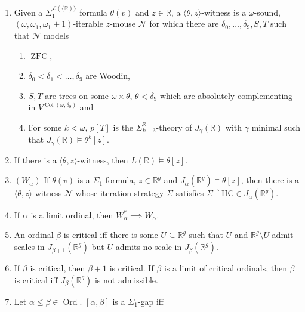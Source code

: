 \documentclass[12pt,a4paper]{article}
\theoremstyle{nicestyle}
\DeclareMathOperator{\Col}{Col}
\DeclareMathOperator{\ord}{Ord}
\DeclareMathOperator{\ZFC}{ZFC}
\begin{document}
\begin{enumerate}
\item Given a $\Sigma_1^{\mathcal{L}(\{\mathbb{R})\}}$ formula $\theta(v)$
  and $z \in \mathbb{R}$, a $\langle \theta, z \rangle$-witness is a
  $\omega$-sound, $(\omega, \omega_{1}, \omega_1+1)$-iterable
  $z$-mouse $\mathcal{N}$ for which there are
  $\delta_0, \ldots, \delta_9, S, T$ such that $\mathcal{N}$ models
  \begin{enumerate}
  \item $\ZFC$,
  \item $\delta_0 < \delta_1 < \ldots, \delta_9$ are Woodin,
  \item $S, T$ are trees on some $\omega \times \theta$,
    $\theta < \delta_9$ which are absolutely complementing in
    $V^{\Col(\omega, \delta_{9})}$ and
  \item For some $k < \omega$, $p[T]$ is the
    $\Sigma_{k+3}^{\mathbb{R}}$-theory of $J_{\gamma}(\mathbb{R})$
    with $\gamma$ minimal such that
    $J_{\gamma}(\mathbb{R}) \models \theta^k[z]$.
  \end{enumerate}
\item If there is a $\langle \theta, z \rangle$-witness, then
  $L(\mathbb{R}) \models \theta[z]$.
\item $(W_{\alpha})$ If $\theta(v)$ is a $\Sigma_{1}$-formula,
  $z \in \mathbb{R}^g$ and
  $J_{\alpha}(\mathbb{R}^{g}) \models \theta[z]$, then there is a
  $\langle \theta, z \rangle$-witness $\mathcal{N}$ whose iteration
  strategy $\Sigma$ satisfies
  $\Sigma \restriction \mathrm{HC} \in J_{\alpha}(\mathbb{R}^g)$.
\item If $\alpha$ is a limit ordinal, then
  $W_{\alpha}^{*} \implies W_{\alpha}$.
\item An ordinal $\beta$ is critical iff there is some $U \subseteq
\mathbb{R}^g$ such that $U$ and $\mathbb{R}^g \setminus U$ admit
scales in $J_{\beta+1}(\mathbb{R}^{g})$ but $U$ admits no scale in
$J_{\beta}(\mathbb{R}^{g})$.
\item If $\beta$ is critical, then $\beta+1$ is critical. If $\beta$
is a limit of critical ordinals, then $\beta$ is critical iff
$J_{\beta}(\mathbb{R}^g)$ is not admissible.
\item Let $\alpha \le \beta \in \ord$. $[\alpha, \beta]$ is a
$\Sigma_1$-gap iff
\end{enumerate}
\end{document}
